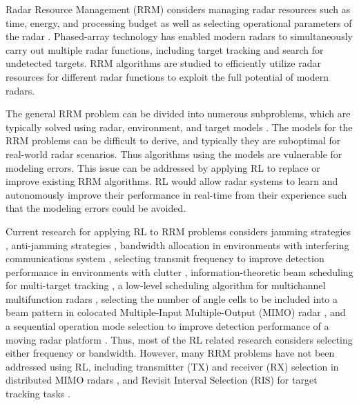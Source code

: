 \documentclass[english, 12pt, a4paper, elec, utf8, a-1b, online]{aaltothesis}
\numberwithin{equation}{section}
\begin{document}
Radar Resource Management (RRM) considers managing radar resources such as time, energy, and processing budget as well as selecting operational parameters of the radar \cite{Moo2016}.
Phased-array technology has enabled modern radars to simultaneously carry out multiple radar functions, including target tracking and search for undetected targets.
RRM algorithms are studied to efficiently utilize radar resources for different radar functions to exploit the full potential of modern radars.

The general RRM problem can be divided into numerous subproblems, which are typically solved using radar, environment, and target models \cite{Moo2016, Koch1999, Krishnamurthy2001, Wintenby2006, LaScala2006, Rajkumar1997, Rajkumar1998, Kastella1997, Kreucher2004, Kreucher2005, Xu2010}.
The models for the RRM problems can be difficult to derive, and typically they are suboptimal for real-world radar scenarios. 
Thus algorithms using the models are vulnerable for modeling errors.
This issue can be addressed by applying RL to replace or improve existing RRM algorithms. 
RL would allow radar systems to learn and autonomously improve their performance in real-time from their experience such that the modeling errors could be avoided. 

Current research for applying RL to RRM problems considers
jamming strategies \cite{Qiang2017, Wang2019, Wang2019a, Zhang2019},
anti-jamming strategies \cite{Kang2018, Ak2019}, 
bandwidth allocation in environments with interfering communications system \cite{Selvi2018, Kozy2019},
selecting transmit frequency to improve detection performance in environments with clutter \cite{Wabeke2010}, 
information-theoretic beam scheduling for multi-target tracking \cite{Kreucher2005, Xu2010},
a low-level scheduling algorithm for multichannel multifunction radars \cite{Shaghaghi2018},
selecting the number of angle cells to be included into a beam pattern in colocated Multiple-Input Multiple-Output (MIMO) radar \cite{Wang2018}, 
and a sequential operation mode selection to improve detection performance of a moving radar platform \cite{Smits2008}.
Thus, most of the RL related research considers selecting either frequency or bandwidth. 
However, many RRM problems have not been addressed using RL, including transmitter (TX) and receiver (RX) selection in distributed MIMO radars \cite{Godrich2011a, Godrich2011, Sun2014}, and Revisit Interval Selection (RIS) for target tracking tasks \cite{Cohen1986, Gardner1988, Munu1992, ChengTing2007,Baek2010, Keuk1975, Watson1993, vanKeuk1993, Daeipour1994, Shin1995, Benoudnine2006, MasoumiGanjgah2017, Charlish2015}.
\end{document}
